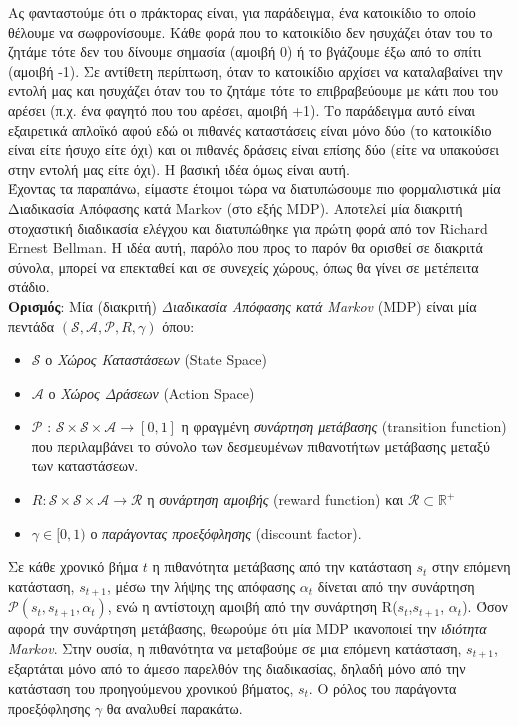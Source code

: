 \documentclass[11pt]{article} %
\numberwithin{equation}{subsection}
\begin{document}
Ας φανταστούμε ότι ο πράκτορας είναι, για παράδειγμα, ένα κατοικίδιο το οποίο θέλουμε να σωφρονίσουμε. Κάθε φορά που το κατοικίδιο δεν ησυχάζει όταν του το ζητάμε τότε δεν του δίνουμε σημασία (αμοιβή 0) ή το βγάζουμε έξω από το σπίτι (αμοιβή -1). Σε αντίθετη περίπτωση, όταν το κατοικίδιο αρχίσει να καταλαβαίνει την εντολή μας και ησυχάζει όταν του το ζητάμε τότε το επιβραβεύουμε με κάτι που του αρέσει (π.χ. ένα φαγητό που του αρέσει, αμοιβή +1). Το παράδειγμα αυτό είναι εξαιρετικά απλοϊκό αφού εδώ οι πιθανές καταστάσεις είναι μόνο δύο (το κατοικίδιο είναι είτε ήσυχο είτε όχι) και οι πιθανές δράσεις είναι επίσης δύο (είτε να υπακούσει στην εντολή μας είτε όχι). Η βασική ιδέα όμως είναι αυτή. \\

Έχοντας τα παραπάνω, είμαστε έτοιμοι τώρα να διατυπώσουμε πιο φορμαλιστικά μία Διαδικασία Απόφασης κατά Markov (στο εξής MDP). Αποτελεί μία διακριτή στοχαστική διαδικασία ελέγχου και διατυπώθηκε για πρώτη φορά από τον Richard Ernest Bellman. Η ιδέα αυτή, παρόλο που προς το παρόν θα ορισθεί σε διακριτά σύνολα, μπορεί να επεκταθεί και σε συνεχείς χώρους, όπως θα γίνει σε μετέπειτα στάδιο.\\

\textbf{Ορισμός}: Μία (διακριτή) \textit{Διαδικασία Απόφασης κατά Markov} (MDP) είναι μία πεντάδα $(\mathcal{S}, \mathcal{A}, \mathcal{P}, R, \gamma)$ όπου:
\begin{itemize}
  \item $\mathcal{S}$ ο \textit{Χώρος Καταστάσεων} (State Space)
  \item $\mathcal{A}$ ο \textit{Χώρος Δράσεων} (Action Space)
  \item $\mathcal{P}$ :  $\mathcal{S} \times  \mathcal{S} \times  \mathcal{A} \rightarrow [0,1]$ η φραγμένη \textit{συνάρτηση μετάβασης} (transition function) που περιλαμβάνει το σύνολο των δεσμευμένων πιθανοτήτων μετάβασης μεταξύ των καταστάσεων.
  \item $R :  \mathcal{S} \times  \mathcal{S} \times  \mathcal{A} \rightarrow  \mathcal{R}$ η \textit{συνάρτηση αμοιβής} (reward function) και  $\mathcal{R}   \subset \mathbb{R}^+$
  \item $\gamma \in [0,1)$ ο \textit{παράγοντας προεξόφλησης} (discount factor). 
\end{itemize}

Σε κάθε χρονικό βήμα $t$ η πιθανότητα μετάβασης από την κατάσταση $s_t$ στην επόμενη κατάσταση, $s_{t+1}$, μέσω την λήψης της απόφασης $\alpha_t$ δίνεται από την συνάρτηση $\mathcal{P}(s_t, s_{t+1},  \alpha_t)$, ενώ η αντίστοιχη αμοιβή από την συνάρτηση R($s_t$,$s_{t+1}$, $\alpha_t$). Όσον αφορά την συνάρτηση μετάβασης, θεωρούμε ότι μία MDP ικανοποιεί την \textit{ιδιότητα Markov}. Στην ουσία, η πιθανότητα να μεταβούμε σε μια επόμενη κατάσταση, $s_{t+1}$, εξαρτάται μόνο από το άμεσο παρελθόν της διαδικασίας, δηλαδή μόνο από την κατάσταση του προηγούμενου χρονικού βήματος, $s_t$. Ο ρόλος του παράγοντα προεξόφλησης $\gamma$ θα αναλυθεί παρακάτω.  \\
\end{document}
